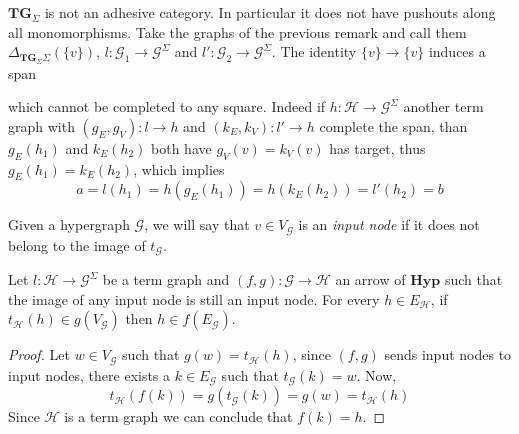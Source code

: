 \documentclass[runningheads,envcountsect]{lmcs}
\newcommand{\hyp}{\catname{Hyp}}
\newcommand{\catname}[1]{\mathbf{#1}}
\newcommand{\tg}[0]{\catname{TG}_{\Sigma}}
\theoremstyle{plain}
\theoremstyle{definition}
\begin{document}
\begin{rem}
	$\tg$ is not an adhesive category. In particular it does not have pushouts along all monomorphisms. Take the graphs of the previous remark and call them $\Delta_{\tg{\Sigma}}(\{v\})$, $l:\mathcal{G}_1\to \mathcal{G}^{\Sigma}$ and $l':\mathcal{G}_2\to \mathcal{G}^{\Sigma}$. The identity $\{v\}\to \{v\}$ induces 
	a span
	
	\begin{center}
	\end{center}
	which cannot be completed to any square. Indeed if $h:\mathcal{H}\to \mathcal{G}^\Sigma$ another term graph with $(g_E, g_V):l\to h$ and $(k_E, k_V):l'\to h$  complete the span, than $g_E(h_1)$ and $k_E(h_2)$ both have $g_V(v)=k_V(v)$ has target, thus  $g_E(h_1)=k_E(h_2)$, which implies
	\[a=l(h_1)=h(g_E(h_1))=h(k_E(h_2))=l'(h_2)=b\]
\end{rem}

\begin{defi}
Given a hypergraph  $\mathcal{G}$, we will say that $v\in V_{\mathcal{G}}$ is an \emph{input node} if it does not belong to the image of $t_{\mathcal{G}}$. 
\end{defi}



\begin{prop}\label{prop:image} 
Let $l:\mathcal{H}\to \mathcal{G}^{\Sigma}$ be a term graph and $(f,g):\mathcal{G}\to \mathcal{H}$ an arrow of $\hyp$ such that the image of any input node is still an input node. For every $h\in E_{\mathcal{H}}$, if $t_{\mathcal{H}}(h)\in g(V_{\mathcal{G}})$ then $h\in f(E_{\mathcal{G}})$.
\end{prop}
\begin{proof}
	Let $w\in V_{\mathcal{G}}$ such that $g(w)=t_{\mathcal{H}}(h)$, since $(f,g)$ sends input nodes to input nodes, there exists a $k\in E_{\mathcal{G}}$ such that $t_{\mathcal{G}}(k)=w$. Now,
	\[t_{\mathcal{H}}(f(k))=g(t_{\mathcal{G}}(k))=g(w)=t_{\mathcal{H}}(h)\]
	Since $\mathcal{H}$ is a term graph we can conclude that $f(k)=h$.
\end{proof}
\end{document}
